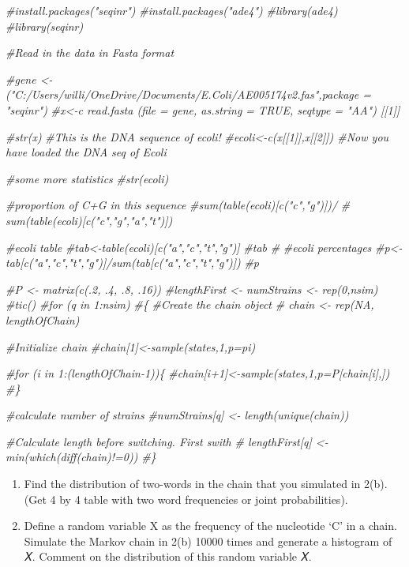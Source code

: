 \documentclass[
]{article}
\newenvironment{Shaded}{\begin{snugshade}}{\end{snugshade}}
\newcommand{\CommentTok}[1]{\textcolor[rgb]{0.56,0.35,0.01}{\textit{#1}}}
\providecommand{\tightlist}{%
  \setlength{\itemsep}{0pt}\setlength{\parskip}{0pt}}
\begin{document}
\begin{Shaded}
\begin{Highlighting}[]
\CommentTok{#install.packages("seqinr")}
\CommentTok{#install.packages("ade4")}
\CommentTok{#library(ade4)}
\CommentTok{#library(seqinr)}

\CommentTok{#Read in the data in Fasta format}


\CommentTok{#gene <- ("C:/Users/willi/OneDrive/Documents/E.Coli/AE005174v2.fas",package = "seqinr") }
\CommentTok{#x<-c read.fasta (file = gene, as.string = TRUE, seqtype = "AA") [[1]]}

\CommentTok{#str(x)}
\CommentTok{#This is the DNA sequence of ecoli!}
\CommentTok{#ecoli<-c(x[[1]],x[[2]]) #Now you have loaded the DNA seq of Ecoli}



\CommentTok{#some more statistics}
\CommentTok{#str(ecoli)}

\CommentTok{#proportion of C+G in this sequence}
\CommentTok{#sum(table(ecoli)[c("c","g")])/}
 \CommentTok{# sum(table(ecoli)[c("c","g","a","t")])}

\CommentTok{#ecoli table}
\CommentTok{#tab<-table(ecoli)[c("a","c","t","g")]}
\CommentTok{#tab}
\CommentTok{#}
\CommentTok{#ecoli percentages}
\CommentTok{#p<-tab[c("a","c","t","g")]/sum(tab[c("a","c","t","g")])}
\CommentTok{#p}

\CommentTok{#P <- matrix(c(.2, .4, .8, .16))}
\CommentTok{#lengthFirst <- numStrains <- rep(0,nsim)}
\CommentTok{#tic()}
\CommentTok{#for (q in 1:nsim)}
\CommentTok{#\{}
  \CommentTok{#Create the chain object}
 \CommentTok{# chain <- rep(NA, lengthOfChain)}
  
  \CommentTok{#Initialize chain}
  \CommentTok{#chain[1]<-sample(states,1,p=pi)}
  
  \CommentTok{#for (i in 1:(lengthOfChain-1))\{}
    \CommentTok{#chain[i+1]<-sample(states,1,p=P[chain[i],])}
  \CommentTok{#\}}
  
  \CommentTok{#calculate number of strains}
  \CommentTok{#numStrains[q] <- length(unique(chain))}
  
  \CommentTok{#Calculate length before switching. First swith}
 \CommentTok{# lengthFirst[q] <- min(which(diff(chain)!=0))}
\CommentTok{#\}}
\end{Highlighting}
\end{Shaded}

\begin{enumerate}
\def\labelenumi{(\alph{enumi})}
\tightlist
\item
  Find the distribution of two-words in the chain that you simulated in
  2(b). (Get 4 by 4 table with two word frequencies or joint
  probabilities).
\item
  Define a random variable X as the frequency of the nucleotide `C' in a
  chain. Simulate the Markov chain in 2(b) 10000 times and generate a
  histogram of 𝑋. Comment on the distribution of this random variable 𝑋.
\end{enumerate}
\end{document}
